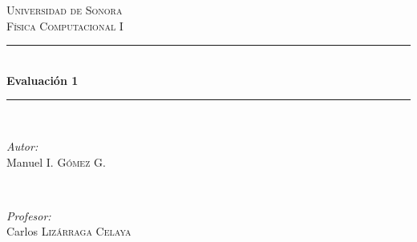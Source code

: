 \begin{titlepage}

\newcommand{\HRule}{\rule{\linewidth}{0.5mm}} %

\center %
 

\textsc{\LARGE Universidad de Sonora}\\[1.5cm] %
\textsc{\Large Física Computacional I}\\[0.5cm] %


\HRule \\[0.4cm]
{ \huge \bfseries Evaluación 1}\\[0.4cm] %
\HRule \\[1.5cm]
 

\begin{minipage}{0.4\textwidth}
\begin{flushleft} \large
\emph{Autor:}\\
Manuel I. \textsc{Gómez G.} %
\end{flushleft}
\end{minipage}
~
\begin{minipage}{0.4\textwidth}
\begin{flushright} \large
\emph{Profesor:} \\
Carlos \textsc{Lizárraga Celaya} %
\end{flushright}
\end{minipage}\\[2cm]



\end{titlepage}
